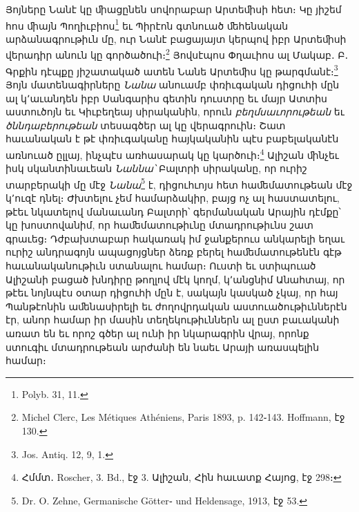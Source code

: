 \documentclass{article}
\begin{document}
{Յոյները Նանէ կը ﬕացընեն սովորաբար Արտեﬕսի հետ։ Կը յիշեմ հոս ﬕայն Պողիւբիոս\footnote{Polyb. 31, 11.} եւ Պիրէոն գտնուած ﬔհենական արձանագրութիւն մը, ուր Նանէ բացայայտ կերպով իբր Արտեﬕսի վերադիր անուն կը գործածուի։\footnote{Michel Clerc, Les Métiques Athéniens, Paris 1893, p. 142֊143. Hoffmann, էջ 130.} Յովսէպոս Փղաւիոս ալ Մակաբ․ Բ․ Գրքին դէպքը յիշատակած ատեն Նանե Արտեﬕս կը թարգմանէ։\footnote{Jos. Antiq. 12, 9, 1.} Յոյն մատենագիրները \emph{Նանա} անուամբ փռիւգական դիցուհի մըն ալ կ՚աւանդեն իբր Սանգարիս գետին դուստրը եւ մայր Ատտիս աստուծոյն եւ Կիւբեղեայ սիրականին, որուն \emph{բեղմսաւորութեան} եւ \emph{ծննդաբերութեան} տեսագծեր ալ կը վերագրուին։ Շատ հաւանական է թէ փռիւգականը հայկականին պէս բաբելականէն առնուած ըլլայ, ինչպէս առհասարակ կը կարծուի։\footnote{Հմմտ․ Roscher, 3. Bd., էջ 3. Ալիշան, Հին հաւատք Հայոց, էջ 298։} Ալիշան ﬕնչեւ իսկ սկանտինաւեան \emph{Նաննա՝} Բալտրի սիրականը, որ ուրիշ տարբերակի մը մէջ \emph{Նանա}\footnote{Dr. O. Zehne, Germanische Götter֊ und Heldensage, 1913, էջ 53.} է, դիցուհւոյս հետ հաﬔմատութեան մէջ կ՚ուզէ դնել։ Ժխտելու չեմ համարձակիր, բայց ոչ ալ հաստատելու, թէեւ նկատելով մանաւանդ Բալտրի՝ գերմանական Արային դէմքը՝ կը խոստովանիմ, որ հաﬔմատութիւնը մտադրութիւնս շատ գրաւեց։ Դժբախտաբար հակառակ իմ ջանքերուս անկարելի եղաւ ուրիշ անդրագոյն ապացոյցներ ձեռք բերել հաﬔմատութենէն գէթ հաւանականութիւն ստանալու համար։ Ուստի եւ ստիպուած Ալիշանի բացած խնդիրը թողլով մէկ կողմ, կ՚անցնիմ Անահտայ, որ թէեւ նոյնպէս օտար դիցուհի մըն է, սակայն կասկած չկայ, որ հայ Պանթէոնին աﬔնասիրելի եւ ժողովրդական աստուածութիւններէն էր, անոր համար իր մասին տեղեկութիւններն ալ ըստ բաւականի առատ են եւ որոշ գծեր ալ ունի իր նկարագրին վրայ, որոնք ստուգիւ մտադրութեան արժանի են նաեւ Արայի առասպելին համար։

}
\end{document}
